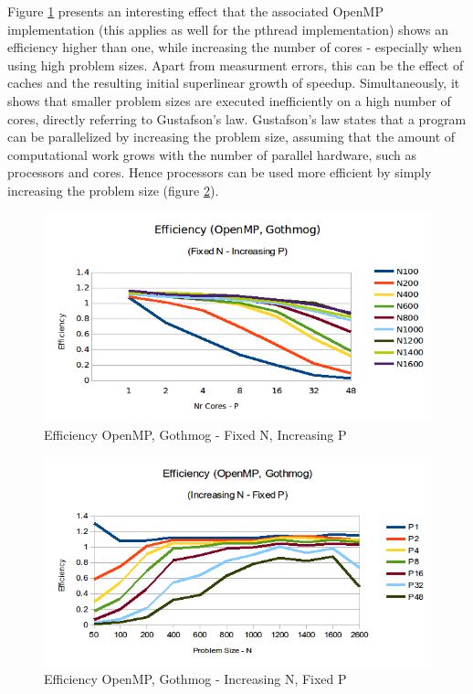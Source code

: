 \documentclass[conference]{IEEEtran}
\begin{document}
Figure \ref{pic:omp_efficiency_fixed-n} presents an interesting effect that the associated OpenMP implementation (this applies as well for the pthread implementation) shows an efficiency higher than one, while increasing the number of cores - especially when using high problem sizes. Apart from measurment errors, this can be the effect of caches and the resulting initial superlinear growth of speedup. Simultaneously, it shows that smaller problem sizes are executed inefficiently on a high number of cores, directly referring to Gustafson's law. Gustafson's law states that a program can be parallelized by increasing the problem size, assuming that the amount of computational work grows with the number of parallel hardware, such as processors and cores. Hence processors can be used more efficient by simply increasing the problem size (figure \ref{pic:omp_eff_fixed-p}). 

\begin{figure}[h]
  \centering
  \includegraphics[scale=0.42]{pic/omp_gothmog_efficiency-fixed-n.png} 
  \caption{Efficiency OpenMP, Gothmog - Fixed N, Increasing P}
  \label{pic:omp_efficiency_fixed-n}
\end{figure}


\begin{figure}[h]
  \centering
  \includegraphics[scale=0.42]{pic/omp_gothmog_efficiency-fixed-p.png} 
  \caption{Efficiency OpenMP, Gothmog - Increasing N, Fixed P}
  \label{pic:omp_eff_fixed-p}
\end{figure}
\end{document}
